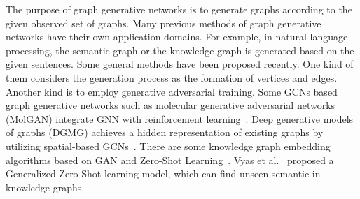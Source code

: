 The purpose of graph generative networks is to generate graphs according to the given observed set of graphs. Many previous methods of graph generative networks have their own application domains. For example, in natural language processing, the semantic graph or the knowledge graph is generated based on the given sentences. Some general methods have been proposed recently. One kind of them considers the generation process as the formation of vertices and edges. Another kind is to employ generative adversarial training. Some GCNs based graph generative networks such as molecular generative adversarial networks (MolGAN) integrate GNN with reinforcement learning~. Deep generative models of graphs (DGMG) achieves a hidden representation of existing graphs by utilizing spatial-based GCNs~. There are some knowledge graph embedding algorithms based on GAN and Zero-Shot Learning~. Vyas et al.~ proposed a Generalized Zero-Shot learning model, which can find unseen semantic in knowledge graphs.


